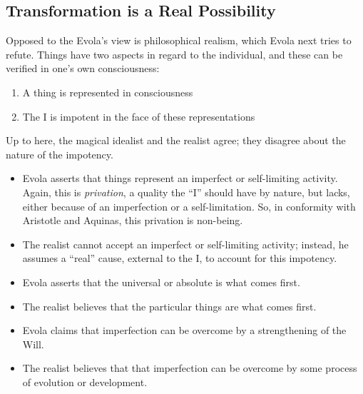 \subsection*{Transformation is a Real Possibility}

Opposed to the Evola's view is philosophical realism, which Evola next tries to refute. Things have two aspects in regard to the individual, and these can be verified in one's own consciousness:

\begin{enumerate}


\item A thing is represented in consciousness

\item The I is impotent in the face of these representations
\end{enumerate}


Up to here, the magical idealist and the realist agree; they disagree about the nature of the impotency.

\begin{itemize}


\item Evola asserts that things represent an imperfect or self-limiting activity. Again, this is \emph{privation}, a quality the ``I'' should have by nature, but lacks, either because of an imperfection or a self-limitation. So, in conformity with Aristotle and Aquinas, this privation is non-being.

\item The realist cannot accept an imperfect or self-limiting activity; instead, he assumes a ``real'' cause, external to the I, to account for this impotency.
\end{itemize}


\begin{itemize}


\item Evola asserts that the universal or absolute is what comes first.

\item The realist believes that the particular things are what comes first.
\end{itemize}


\begin{itemize}


\item Evola claims that imperfection can be overcome by a strengthening of the Will.

\item The realist believes that that imperfection can be overcome by some process of evolution or development.
\end{itemize}


